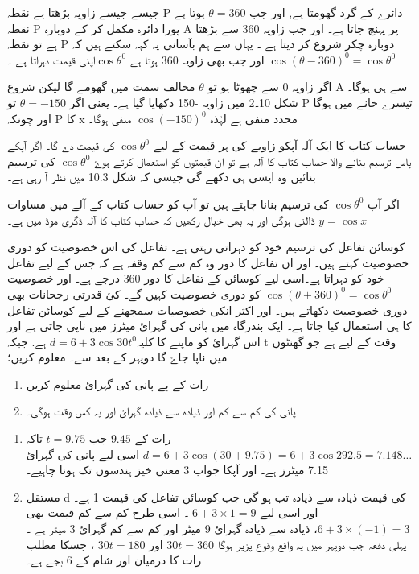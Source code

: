 جیسے جیسے زاویہ بڑھتا ہے نقطہ P  دائرے کے گرد گھومتا ہے, اور جب  \(\theta=360\) ہوتا ہے نقطہ  P    پورا دائرہ مکمل کر کے دوبارہ   A  پر پہنچ جاتا ہے۔ اور جب زاویہ 360 سے بڑھتا ہے تو نقطہ  P      دوبارہ چکر شروع کر دیتا ہے ۔ یہاں سے ہم بآسانی یہ کہہ سکتے ہیں کہ \(\cos(\theta-360)^{0}=\cos\theta^{0}\) اور جب بھی زاویہ 360 ہوتا ہے \(\cos{\theta}^{0}\)اپنی قیمت دہراتا ہے ۔

اگر زاویہ 0 سے چھوٹا ہو تو \(\theta\) مخالف سمت میں گھومے گا لیکن شروع  A سے ہی ہوگا۔ شکل 10۔2 میں زاویہ -150 دکھایا گیا ہے۔ یعنی اگر  \(\theta=-150\) تو   P    تیسرے خانے میں  ہوگا اور چونکہ P    کا  x محدد منفی ہے لہٰذہ \(\cos(-150)^{0}\) منفی ہوگا۔

حساب کتاب کا ایک آلہ آپکو زاویے کی ہر قیمت کے لیے \(\cos{\theta}^{0}\) کی قیمت دے گا۔ اگر آپکے پاس ترسیم بنانے والا حساب کتاب کا آلہ ہے تو ان قیمتوں کو استعمال کرتے ہوۓ \(\cos{\theta}^{0}\) کی ترسیم بنائیں وہ ایسی ہی دکھے گی جیسی کہ شکل 10.3 میں نظر آ رہی ہے۔

اگر آپ \(\cos{\theta}^{0}\) کی ترسیم بنانا چاہتے ہیں تو آپ کو حساب کتاب کے آلے میں مساوات \(y=\cos x\) ڈالنی ہوگی اور یہ بھی خیال رکھیں کہ حساب کتاب کا آلہ ڈگری موڈ میں ہے۔

کوسائن تفاعل کی ترسیم خود کو دہراتی رہتی ہے۔  تفاعل  کی اس خصوصیت کو دوری خصوصیت کہتے ہیں۔ اور ان تفاعل کا دور وہ کم سے کم وقفہ ہے کہ جس کے لیے تفاعل خود کو دہراتا ہے۔اسی لیے کوسائن کے تفاعل کا دور 360 درجے ہے۔ اور خصوصیت \(\cos(\theta\pm360)^{0}=\cos\theta^{0}\)
کو دوری خصوصیت کہیں گے۔ کئ قدرتی رجحانات بھی دوری خصوصیت دکھاتے ہیں۔ اور اکثر انکی خصوصیات سمجھنے کے لیے کوسائن تفاعل کا ہی استعمال کیا جاتا ہے۔
ایک بندرگاہ میں پانی کی گہرائ میٹرز میں ناپی جاتی ہے اور اس گہرائ کو ماپنے کا کلیہ\(d=6+3\cos30t^{0}\) ہے. جبکہ  t وقت کے لیے ہے جو گھنٹوں میں ناپا جاۓ گا دوپہر کے بعد سے۔ معلوم کریں؛
\begin{enumerate}
\item 
رات کے      پے پانی کی گہرائ معلوم کریں
\item
پانی کی کم سے کم اور ذیادہ سے ذیادہ گہرائ اور یہ کس وقت ہوگی۔
\end{enumerate}
\begin{enumerate}
\item
رات کے \(9.45\)  جب \(t=9.75\) تاکہ  \(d=6+3\cos(30+9.75)=6+3\cos292.5=7.148\dotsc\)
اسی لیے پانی کی گہرائ 7.15 میٹرز ہے۔ اور آپکا جواب 3 معنی خیز ہندسوں تک ہونا چاہیے۔
\item
مستقل  d     کی قیمت ذیادہ سے ذیادہ تب ہو گی جب کوسائن تفاعل کی قیمت 1 ہے۔ اور اسی لیے \(6+3\times1=9\) ۔ اسی طرح کم سے کم قیمت بھی \(6+3\times(-1)=3\)، ذیادہ سے ذیادہ گہرائ 9 میٹر اور کم سے کم گہرائ 3 میٹر ہے ۔پہلی دفعہ جب دوپہر میں یہ واقع وقوع پزیر ہوگا \(30t=360\) اور \(30t=180\) ، جسکا مطلب رات کا درمیان اور شام کے 6 بجے ہے۔
\end{enumerate}

